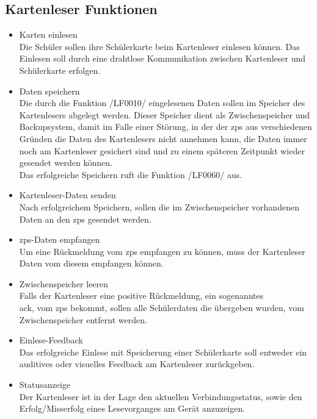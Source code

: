 \subsection{Kartenleser Funktionen}
\begin{itemize}[leftmargin=1.0in]
    \item [\lf] Karten einlesen \\
        Die Schüler sollen ihre Schülerkarte beim Kartenleser einlesen können. Das Einlesen soll durch eine drahtlose Kommunikation zwischen Kartenleser und Schülerkarte erfolgen. \newpage
    \item [\lf] Daten speichern \\
        Die durch die Funktion /LF0010/ eingelesenen Daten sollen im Speicher des Kartenlesers abgelegt werden. Dieser Speicher dient als Zwischenspeicher und Backupsystem, damit im Falle einer Störung, in der der \gls{zps} aus verschiedenen Gründen die Daten des Kartenlesers nicht annehmen kann, die Daten immer noch am Kartenleser gesichert sind und zu einem späteren Zeitpunkt wieder gesendet werden können. \\
        Das erfolgreiche Speichern ruft die Funktion /LF0060/ aus.
    \item [\lf] Kartenleser-Daten senden \\
        Nach erfolgreichem Speichern, sollen die im Zwischenspeicher vorhandenen Daten an den \gls{zps} gesendet werden. 
    \item [\lf] \gls{zps}-Daten empfangen \\
        Um eine Rückmeldung vom \gls{zps} empfangen zu können, muss der Kartenleser Daten vom diesem empfangen können. 
    \item [\lf] Zwischenspeicher leeren \\
        Falls der Kartenleser eine positive Rückmeldung, ein sogenanntes \\ \gls{ack}, vom \gls{zps} bekommt,  %
        sollen alle Schülerdaten die übergeben wurden, vom Zwischenspeicher entfernt werden.
    \item [\lf] Einlese-Feedback \\
        Das erfolgreiche Einlese mit Speicherung einer Schülerkarte soll entweder ein auditives oder visuelles Feedback am Kartenleser zurückgeben.
    \item [\lf] Statusanzeige \\
        Der Kartenleser ist in der Lage den aktuellen Verbindungsstatus, sowie den Erfolg/Misserfolg eines Lesevorganges am Gerät anzuzeigen.
\end{itemize}
    \lfn
